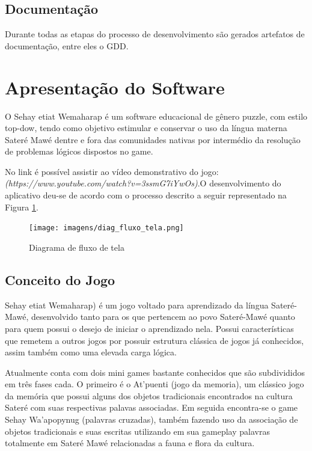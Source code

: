 \documentclass[12pt]{article}
\begin{document}
	\subsection{Documentação}
		Durante todas as etapas do processo de desenvolvimento são gerados artefatos de documentação, entre eles o GDD.
		
	\section{Apresentação do Software}
		O Sehay etiat Wemaharap é um software educacional de gênero puzzle, com estilo top-dow, tendo como objetivo estimular e conservar o uso da língua materna Sateré Mawé dentre e fora das comunidades nativas por intermédio da resolução de problemas lógicos dispostos no
		game.
		
		No link é possível assistir ao vídeo demonstrativo do jogo: \textit{(https://www.youtube.com/watch?v=3ssmG7iYwOs)}.O desenvolvimento do aplicativo deu-se de acordo com o processo descrito a
		seguir representado na Figura \ref{fig:fluxoTela}.
	
		\begin{figure}[htb]
			\centering
			\texttt{[image: imagens/diag\_fluxo\_tela.png]}
			\caption{Diagrama de fluxo de tela}
			\label{fig:fluxoTela}
		\end{figure}

	\subsection{Conceito do Jogo}
		Sehay etiat Wemaharap) é um jogo voltado para aprendizado da língua Sateré-Mawé, desenvolvido tanto para os que pertencem ao povo Sateré-Mawé quanto para quem possui o desejo de iniciar o aprendizado nela. Possui características que remetem a outros jogos por possuir estrutura clássica de jogos já conhecidos, assim também como uma elevada carga lógica.
		
		Atualmente conta com dois mini games bastante conhecidos que são subdivididos em três fases cada. O primeiro é o At'puenti (jogo da memoria), um clássico jogo da memória que possui alguns dos objetos tradicionais encontrados na cultura Sateré com suas respectivas palavas associadas. Em seguida encontra-se o game Sehay Wa’apopynug (palavras cruzadas), também fazendo uso da associação de objetos tradicionais e suas escritas utilizando em sua gameplay palavras totalmente em Sateré Mawé relacionadas a fauna e flora da cultura.    
		
\end{document}

